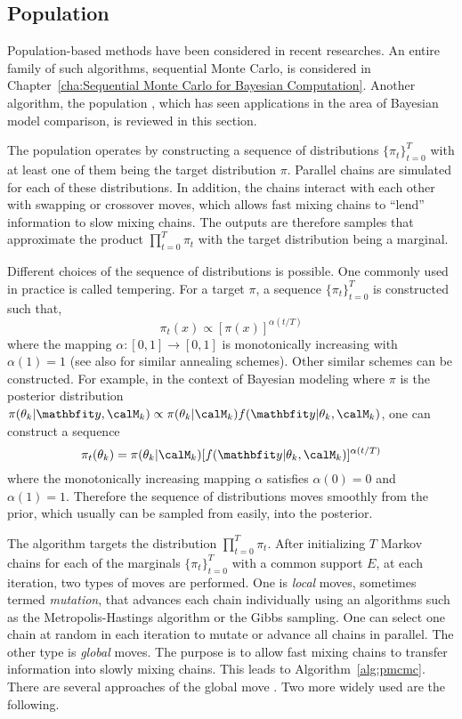 \subsection{Population \protect\mcmc}
\label{sub:Population mcmc}

Population-based methods have been considered in recent researches. An entire
family of such algorithms, sequential Monte Carlo, is considered in
Chapter~\ref{cha:Sequential Monte Carlo for Bayesian Computation}. Another
algorithm, the population \mcmc, which has seen applications in the area of
Bayesian model comparison, is reviewed in this section.

The population \mcmc operates by constructing a sequence of distributions
$\{\pi_t\}_{t=0}^T$ with at least one of them being the target distribution
$\pi$. Parallel \mcmc chains are simulated for each of these distributions. In
addition, the chains interact with each other with swapping or crossover
moves, which allows fast mixing chains to ``lend'' information to slow mixing
chains. The outputs are therefore samples that approximate the product
$\prod_{t=0}^T\pi_t$ with the target distribution being a marginal.

Different choices of the sequence of distributions is possible. One commonly
used in practice is called tempering. For a target $\pi$, a sequence
$\{\pi_t\}_{t=0}^T$ is constructed such that,
\begin{equation}
  \pi_t(x) \propto [\pi(x)]^{\alpha(t/T)}
\end{equation}
where the mapping $\alpha:[0,1]\to[0,1]$ is monotonically increasing with
$\alpha(1) = 1$ (see also \cite{Marinari:1992vx} for similar annealing
schemes). Other similar schemes can be constructed. For example, in the
context of Bayesian modeling where $\pi$ is the posterior distribution
$\pi(\theta_k|\data,\calM_k) \propto
\pi(\theta_k|\calM_k)f(\data|\theta_k,\calM_k)$, one can construct a sequence
\begin{equation}
  \pi_t(\theta_k) =
  \pi(\theta_k|\calM_k)[f(\data|\theta_k,\calM_k)]^{\alpha(t/T)}
  \label{eq:power post}
\end{equation}
where the monotonically increasing mapping $\alpha$ satisfies $\alpha(0) = 0$
and $\alpha(1) = 1$. Therefore the sequence of distributions moves smoothly
from the prior, which usually can be sampled from easily, into the posterior.

The algorithm targets the distribution $\prod_{t=0}^T\pi_t$. After
initializing $T$ Markov chains for each of the marginals $\{\pi_t\}_{t=0}^T$
with a common support $E$, at each iteration, two types of moves are
performed. One is \emph{local} moves, sometimes termed \emph{mutation}, that
advances each chain individually using an \mcmc algorithms such as the
Metropolis-Hastings algorithm or the Gibbs sampling. One can select one chain
at random in each iteration to mutate or advance all chains in parallel. The
other type is \emph{global} moves. The purpose is to allow fast mixing chains
to transfer information into slowly mixing chains. This leads to
Algorithm~\ref{alg:pmcmc}. There are several approaches of the global move
\cite{Jasra:2007in}. Two more widely used are the following.

